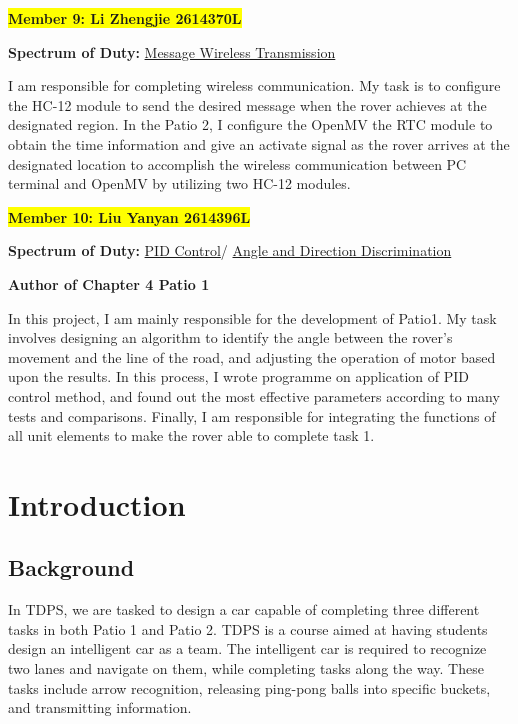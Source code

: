 \documentclass[12pt, a4paper, oneside]{report}
\begin{document}
\colorbox{yellow}{\textbf{Member 9: Li Zhengjie 2614370L} }
\begin{tcolorbox}
\textbf{Spectrum of Duty:} 
\hyperref[sec:hc12]{\textcolor{mybg}{Message Wireless Transmission}}
\end{tcolorbox}
I am responsible for completing wireless communication. My task is to configure the HC-12 module to send the desired message when the rover achieves at the designated region. In the Patio 2, I configure the OpenMV the RTC module to obtain the time information and give an activate signal as the rover arrives at the designated location to accomplish the wireless communication between PC terminal and OpenMV by utilizing two HC-12 modules.
\vspace{\baselineskip}

\colorbox{yellow}{\textbf{Member 10: Liu Yanyan 2614396L} }
\begin{tcolorbox}
\textbf{Spectrum of Duty:} 
\hyperref[sec:PID]{\textcolor{mybg}{PID Control}}/
\hyperref[sec:add]{\textcolor{mybg}{Angle and Direction Discrimination}}

\textbf{Author of Chapter 4 Patio 1}
\end{tcolorbox}
In this project, I am mainly responsible for the development of Patio1. My task involves designing an algorithm to identify the angle between the rover’s movement and the line of the road, and adjusting the operation of motor based upon the results. In this process, I wrote programme on application of PID control method, and found out the most effective parameters according to many tests and comparisons. Finally, I am responsible for integrating the functions of all unit elements to make the rover able to complete task 1.
	
\tableofcontents
\listoffigures
\listoftables

\chapter{Introduction}
\section{Background}
In TDPS, we are tasked to design a car capable of completing three different tasks in both Patio 1 and Patio 2. TDPS is a course aimed at having students design an intelligent car as a team. The intelligent car is required to recognize two lanes and navigate on them, while completing tasks along the way. These tasks include arrow recognition, releasing ping-pong balls into specific buckets, and transmitting information.
\end{document}

